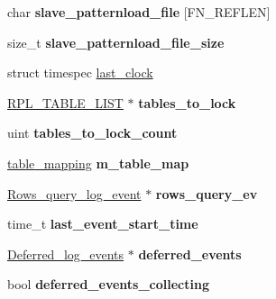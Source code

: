 \begin{DoxyCompactItemize}
char {\bfseries slave\+\_\+patternload\+\_\+file} \mbox{[}F\+N\+\_\+\+R\+E\+F\+L\+EN\mbox{]}
\item 
\mbox{\label{classRelay__log__info_a327da5ee7ada2691232c88b7d461a0e3}} 
size\+\_\+t {\bfseries slave\+\_\+patternload\+\_\+file\+\_\+size}
\item 
struct timespec \mbox{\hyperlink{classRelay__log__info_a2a6610b50302ab38599e82bda93c53ce}{last\+\_\+clock}}
\item 
\mbox{\label{classRelay__log__info_adc2326e9be6c8e691e0ccc01a4f24a96}} 
\mbox{\hyperlink{structRPL__TABLE__LIST}{R\+P\+L\+\_\+\+T\+A\+B\+L\+E\+\_\+\+L\+I\+ST}} $\ast$ {\bfseries tables\+\_\+to\+\_\+lock}
\item 
\mbox{\label{classRelay__log__info_a63bb6d3c259c2adc63e3886478951717}} 
uint {\bfseries tables\+\_\+to\+\_\+lock\+\_\+count}
\item 
\mbox{\label{classRelay__log__info_a23dbc6aff700428d743d8413794bb93e}} 
\mbox{\hyperlink{classtable__mapping}{table\+\_\+mapping}} {\bfseries m\+\_\+table\+\_\+map}
\item 
\mbox{\label{classRelay__log__info_a18cf6e5f7f2d3c1f2cf96fbcf850b9ab}} 
\mbox{\hyperlink{classRows__query__log__event}{Rows\+\_\+query\+\_\+log\+\_\+event}} $\ast$ {\bfseries rows\+\_\+query\+\_\+ev}
\item 
\mbox{\label{classRelay__log__info_ad008be98e874b09908d1db5dd24afc12}} 
time\+\_\+t {\bfseries last\+\_\+event\+\_\+start\+\_\+time}
\item 
\mbox{\label{classRelay__log__info_a663b8408cbe5d4c4835a8d5056ecf0ab}} 
\mbox{\hyperlink{classDeferred__log__events}{Deferred\+\_\+log\+\_\+events}} $\ast$ {\bfseries deferred\+\_\+events}
\item 
\mbox{\label{classRelay__log__info_ad8996d82e9017c6c40237e7fa3744711}} 
bool {\bfseries deferred\+\_\+events\+\_\+collecting}
\item 
\mbox{\label{classRelay__log__info_ae7b85681986de5005ba80f84a92945cb}} 

\end{DoxyCompactItemize}

